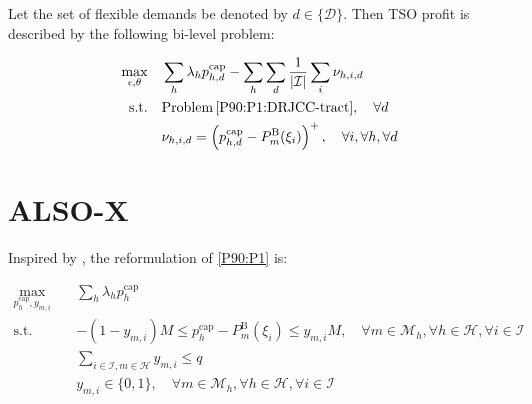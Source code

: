 \documentclass{report}
\begin{document}
Let the set of flexible demands be denoted by $d \in \{\mathcal{D} \}$. Then TSO profit is described by the following bi-level problem:

\begin{subequations}
    \begin{align}
        \max_{\epsilon, \theta} \quad & \sum_h \lambda_h p_{h,d}^{\text{cap}} - \sum_h \sum_d \frac{1}{|\mathcal{I}|}\sum_i \nu_{h,i,d}                                                                                                                                                                                                      \\
        \text{s.t.} \quad               & \text{Problem} \thinspace \eqref{P90:P1:DRJCC-tract}, \quad \forall{d} \\
        & \nu_{h,i,d} = \left(p_{h,d}^{\text{cap}} - P_{m}^{\text{B}}(\xi_i) \right)^{+}, \quad \forall{i}, \forall{h}, \forall{d}
    \end{align}
\end{subequations}

\section*{ALSO-X}

Inspired by \cite{jiang2022also, porras2023integrating}, the reformulation of \eqref{P90:P1} is:

\begin{align}\label{P90:P1:ALSO-X}
    \max_{p_{h}^{\text{cap}}, y_{m,i} } \quad & \sum_h \lambda_h p_{h}^{\text{cap}}                                                                                                                                            \\
    \text{s.t.} \quad                         & -(1-y_{m,i})M \leq  p_{h}^{\text{cap}} - P_{m}^{\text{B}}(\xi_i) \leq y_{m,i} M, \quad \forall{m} \in \mathcal{M}_{h},  \forall{h} \in \mathcal{H}, \forall{i} \in \mathcal{I} \\
                                              & \sum_{i \in \mathcal{I}, m \in \mathcal{H}} y_{m,i} \leq q                                                                                                                     \\
                                              & y_{m,i} \in \{0,1\}, \quad \forall{m} \in \mathcal{M}_{h},  \forall{h} \in \mathcal{H}, \forall{i} \in \mathcal{I}
\end{align}
\end{document}
